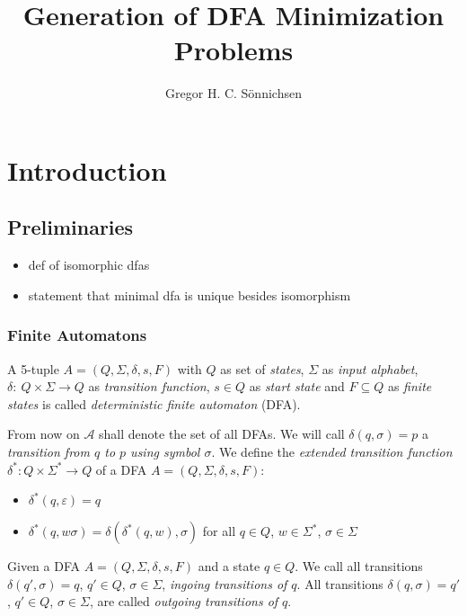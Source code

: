 \documentclass[a4paper, oneside, 11pt]{report}
\title{Generation of DFA Minimization Problems}
\author{Gregor H. C. Sönnichsen}
\theoremstyle{definition}
\theoremstyle{remark}
\begin{document}
\maketitle



\tableofcontents

\chapter{Introduction}

\section{Preliminaries}

\begin{itemize}
	\item def of isomorphic dfas
	\item statement that minimal dfa is unique besides isomorphism
\end{itemize}

\subsection{Finite Automatons}

A 5-tuple $A = (Q, \Sigma, \delta, s, F)$ with $Q$ as set of \emph{states}, $\Sigma$ as \emph{input alphabet}, $\delta \colon\ Q \times \Sigma \to Q$ as \emph{transition function}, $s \in Q$ as \emph{start state} and $F \subseteq Q$ as \emph{finite states} is called \emph{deterministic finite automaton} (DFA).

From now on $\mathcal{A}$ shall denote the set of all DFAs. We will call $\delta(q,\sigma) = p$ a \emph{transition from $q$ to $p$ using symbol $\sigma$}.
We define the \emph{extended transition function} $\delta^* : Q \times \Sigma^* \to Q$ of a DFA $A = (Q, \Sigma, \delta, s, F)$:
\begin{itemize}
	\item $\delta^*(q,\varepsilon) = q$
	\item $\delta^*(q,w\sigma) = \delta(\delta^*(q,w),\sigma)$ for all $q \in Q$, $w \in \Sigma^*$, $\sigma \in \Sigma$
\end{itemize}
Given a DFA $A = (Q, \Sigma, \delta, s, F)$ and a state $q \in Q$. We call all transitions $\delta(q', \sigma) = q$, $q'\in Q$, $\sigma\in\Sigma$, \emph{ingoing transitions of $q$}. All transitions $\delta(q, \sigma) = q'$, $q'\in Q$, $\sigma\in\Sigma$, are called \emph{outgoing transitions of $q$}.
\end{document}
